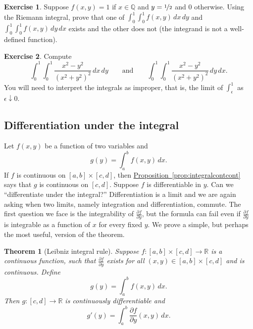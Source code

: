 \documentclass[12pt,openany]{book}
\newcommand{\R}{{\mathbb{R}}}
\newcommand{\Q}{{\mathbb{Q}}}
\newcommand{\myindex}[1]{#1\index{#1}}
\newcommand{\myquote}[1]{``#1''}
\theoremstyle{plain}
\newtheorem{thm}{Theorem}[section]
\theoremstyle{remark}
\theoremstyle{definition}
\newenvironment{exbox}{%
    \def\FrameCommand{\vrule width 1pt \relax\hspace{10pt}}%
    \MakeFramed{\advance\hsize-\width\FrameRestore}%
}{%
    \endMakeFramed
}
\theoremstyle{exercise}
\newtheorem{exercise}{Exercise}[section]
\theoremstyle{example}
\newcommand{\propref}[1]{\hyperref[#1]{Proposition~\ref*{#1}}}
\begin{document}
\begin{exbox}
\begin{exercise}
Suppose $f(x,y) = 1$ if $x \in \Q$ and $y=\nicefrac{1}{2}$ and $0$ otherwise.
Using the Riemann integral, prove that one of
$\int_0^1 \int_0^1 f(x,y) \, dx \, dy$ and
$\int_0^1 \int_0^1 f(x,y) \, dy \, dx$ exists and the other does not (the
integrand is not a well-defined function).
\end{exercise}

\begin{exercise}
Compute
\begin{equation*}
\int_0^1 \int_0^1 \frac{x^2-y^2}{{(x^2+y^2)}^2} \, dx \, dy
\qquad \text{and} \qquad
\int_0^1 \int_0^1 \frac{x^2-y^2}{{(x^2+y^2)}^2} \, dy \, dx .
\end{equation*}
You will need to interpret the integrals as improper, that
is, the limit of $\int_\epsilon^1$ as $\epsilon \downarrow 0$.
\end{exercise}
\end{exbox}

\subsection{Differentiation under the integral}
\label{subsec:diffunderint}

Let $f(x,y)$ be a function of two variables and
\begin{equation*}
g(y) = \int_a^b f(x,y) \,dx .
\end{equation*}
If $f$ is continuous on $[a,b] \times [c,d]$, then
\propref{prop:integralcontcont}
says that $g$ is continuous on $[c,d]$.
Suppose $f$ is differentiable in $y$.
Can we \myquote{differentiate under the integral?}
Differentiation is a limit and we are again asking when
two limits, namely integration and differentiation, commute.
The first
question we face is the integrability of
$\frac{\partial f}{\partial y}$, but the formula can fail even if
$\frac{\partial f}{\partial y}$ is integrable as a function of $x$ for every
fixed $y$.
We prove a simple, but perhaps the most useful, version of the theorem.

\begin{thm}[\myindex{Leibniz integral rule}]
\label{thm:Leibnizrule}
Suppose $f \colon [a,b] \times [c,d] \to \R$ is a continuous function,
such that $\frac{\partial f}{\partial y}$ exists for all $(x,y) \in [a,b]
\times [c,d]$ and is continuous.  Define
\begin{equation*}
g(y) = \int_a^b f(x,y) \,dx .
\end{equation*}
Then $g \colon [c,d] \to \R$ is continuously differentiable and
\begin{equation*}
g'(y) = \int_a^b \frac{\partial f}{\partial y}(x,y) \,dx .
\end{equation*}
\end{thm}
\end{document}
